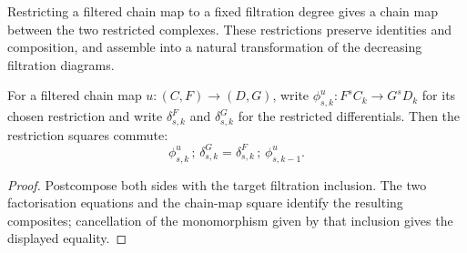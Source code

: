 \begin{definition}
  \label{def:filtered-chain-level-functor}
  \leanok
  Restricting a filtered chain map to a fixed filtration degree gives a chain
  map between the two restricted complexes.  These restrictions preserve
  identities and composition, and assemble into a natural transformation of
  the decreasing filtration diagrams.
\end{definition}

\begin{theorem}
  \label{thm:filtered-chain-map-restricted-differential}
  \leanok
  For a filtered chain map $u:(C,F)\to(D,G)$, write
  $\phi^u_{s,k}:F^sC_k\to G^sD_k$ for its chosen restriction and write
  $\delta^F_{s,k}$ and $\delta^G_{s,k}$ for the restricted differentials.
  Then the restriction squares commute:
  \[
    \phi^u_{s,k}\,;\,\delta^G_{s,k}
      =\delta^F_{s,k}\,;\,\phi^u_{s,k-1}.
  \]
\end{theorem}

\begin{proof}
  \leanok
  Postcompose both sides with the target filtration inclusion.  The two
  factorisation equations and the chain-map square identify the resulting
  composites; cancellation of the monomorphism given by that inclusion gives
  the displayed equality.
\end{proof}

